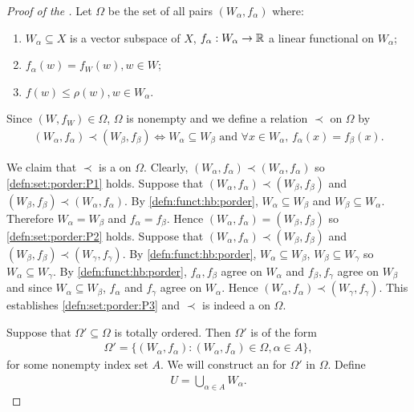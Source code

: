 \begin{proof}[Proof of the ]

Let $\Omega$ be the set of all pairs $(W_\alpha, f_{\alpha})$ where:
\begin{enumerate}[label=(\roman*), noitemsep]
\item \label{axiom:hb:inclusion} $W_\alpha \subseteq X$ is a vector subspace of $X$, $f_\alpha : W_\alpha \to {\mathbb R}$ a linear functional on $W_\alpha$;
\item \label{axiom:hb:extension} $f_\alpha(w) = f_{W}(w), w \in W$; 
\item \label{axiom:hb:domination} $f(w) \leq \rho(w), w\in W_\alpha$. 
\end{enumerate}
Since $(W, f_{W}) \in \Omega$, $\Omega$ is nonempty and we define a relation $\prec$ on $\Omega$ by
\begin{align}
    \label{defn:funct:hb:porder}
    (W_\alpha, f_\alpha) \prec (W_\beta, f_\beta) \iff W_\alpha \subseteq W_\beta \text{ and $\forall x \in W_\alpha$, } f_\alpha(x) = f_\beta(x).
\end{align}

We claim that $\prec$ is a  on $\Omega$. Clearly, $(W_\alpha, f_\alpha) \prec (W_\alpha, f_\alpha)$ so \ref{defn:set:porder:P1} holds. Suppose that $(W_\alpha, f_\alpha) \prec (W_\beta, f_\beta)$ and $(W_\beta, f_\beta) \prec (W_\alpha, f_\alpha)$. By \ref{defn:funct:hb:porder}, $W_\alpha \subseteq W_\beta$ and $W_\beta \subseteq W_\alpha$. Therefore $W_\alpha = W_\beta$ and $f_\alpha = f_\beta$. Hence $(W_\alpha, f_\alpha) = (W_\beta, f_\beta)$ so \ref{defn:set:porder:P2} holds. Suppose that $(W_\alpha, f_\alpha) \prec (W_\beta, f_\beta)$ and $(W_\beta, f_\beta) \prec (W_\gamma, f_\gamma)$. By \ref{defn:funct:hb:porder}, $W_\alpha \subseteq W_\beta$, $W_\beta \subseteq W_\gamma$ so $W_\alpha \subseteq W_\gamma$. By \ref{defn:funct:hb:porder}, $f_\alpha, f_\beta$ agree on $W_\alpha$ and $f_\beta, f_\gamma$ agree on $W_\beta$ and since $W_\alpha \subseteq W_\beta$, $f_\alpha$ and $f_\gamma$ agree on $W_\alpha$. Hence $(W_\alpha, f_\alpha) \prec (W_\gamma, f_\gamma)$. This establishes \ref{defn:set:porder:P3} and $\prec$ is indeed a  on $\Omega$.

Suppose that $\Omega' \subseteq \Omega$ is totally ordered. Then $\Omega'$ is of the form 
\begin{align*}
    \Omega' = \{ (W_\alpha, f_\alpha) : (W_\alpha, f_\alpha) \in \Omega, \alpha \in A  \},
\end{align*} for some nonempty index set $A$. 
We will construct an  for $\Omega'$ in $\Omega$. Define
\begin{align}
    \label{defn:funct:hb:W}
    U = \bigcup_{\alpha \in A} W_\alpha.
\end{align}


\end{proof}
